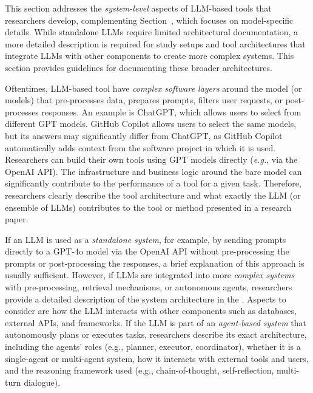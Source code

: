This section addresses the \emph{system-level} aspects of LLM-based tools that researchers develop, complementing Section~\modelversion, which focuses on model-specific details.
While standalone LLMs require limited architectural documentation, a more detailed description is required for study setups and tool architectures that integrate LLMs with other components to create more complex systems.
This section provides guidelines for documenting these broader architectures.


Oftentimes, LLM-based tool have \emph{complex software layers} around the model (or models) that pre-processes data, prepares prompts, filters user requests, or post-processes responses.
An example is ChatGPT, which allows users to select from different GPT models.
GitHub Copilot allows users to select the same models, but its answers may significantly differ from ChatGPT, as GitHub Copilot automatically adds context from the software project in which it is used.
Researchers can build their own tools using GPT models directly (\textit{e.g.}, via the OpenAI API).
The infrastructure and business logic around the bare model can significantly contribute to the performance of a tool for a given task.
Therefore, researchers \must clearly describe the tool architecture and what exactly the LLM (or ensemble of LLMs) contributes to the tool or method presented in a research paper.

If an LLM is used as a \emph{standalone system}, for example, by sending prompts directly to a GPT-4o model via the OpenAI API without pre-processing the prompts or post-processing the responses, a brief explanation of this approach is usually sufficient.
However, if LLMs are integrated into more \emph{complex systems} with pre-processing, retrieval mechanisms, or autonomous agents, researchers \must provide a detailed description of the system architecture in the \paper.
Aspects to consider are how the LLM interacts with other components such as databases, external APIs, and frameworks.
If the LLM is part of an \emph{agent-based system} that autonomously plans or executes tasks, researchers \must describe its exact architecture, including the agents' roles (e.g., planner, executor, coordinator), whether it is a single-agent or multi-agent system, how it interacts with external tools and users, and the reasoning framework used (e.g., chain-of-thought, self-reflection, multi-turn dialogue).

